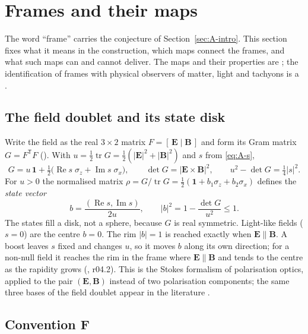 \section{Frames and their maps}
\label{sec:A-frames}

The word ``frame'' carries the conjecture of Section~\ref{sec:A-intro}. This section fixes what it
means in the construction, which maps connect the frames, and what such maps can and cannot deliver.
The maps and their properties are \Established; the identification of frames with physical
observers of matter, light and tachyons is a \Reading.

\subsection{The field doublet and its state disk}
\label{sec:A-doublet}

Write the field as the real $3\times2$ matrix $F=[\,\mathbf E\mid\mathbf B\,]$ and form its Gram matrix
$G=F^{\mathsf T}F$ (). With $u=\tfrac12\operatorname{tr}G=\tfrac12(|\mathbf E|^2+|\mathbf B|^2)$ and
$s$ from \eqref{eq:A-s},
\begin{equation}
G=u\,\mathbf 1+\tfrac12\bigl(\operatorname{Re}s\;\sigma_z+\operatorname{Im}s\;\sigma_x\bigr),
\qquad \det G=|\mathbf E\times\mathbf B|^2,\qquad u^2-\det G=\tfrac14|s|^2 .
\label{eq:A-gram}
\end{equation}
For $u>0$ the normalised matrix $\rho=G/\operatorname{tr}G=\tfrac12(\mathbf 1+b_1\sigma_z+b_2\sigma_x)$
defines the \emph{state vector}
\begin{equation}
b=\frac{(\operatorname{Re}s,\operatorname{Im}s)}{2u},\qquad
|b|^2=1-\frac{\det G}{u^2}\le1 .
\label{eq:A-disk}
\end{equation}
The states fill a disk, not a sphere, because $G$ is real symmetric. Light-like fields ($s=0$) are
the centre $b=0$. The rim $|b|=1$ is reached exactly when $\mathbf E\parallel\mathbf B$. A boost leaves
$s$ fixed and changes $u$, so it moves $b$ along its own direction; for a non-null field it reaches
the rim in the frame where $\mathbf E\parallel\mathbf B$ and tends to the centre as the rapidity grows
(, r04.2). This is the Stokes formalism of polarisation optics, applied to the pair
$(\mathbf E,\mathbf B)$ instead of two polarisation components; the same three bases of the field
doublet appear in the literature \cite{A-Golat2024}.

\subsection{Convention F}
\label{sec:A-convention}

